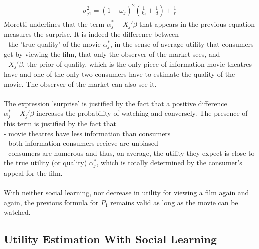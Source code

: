 	\begin{align*}
	\sigma_{j 1}^{2}=(1-\omega_{j})^{2}\left(\frac{1}{k_{j}}+\frac{1}{d}\right)+\frac{1}{r}
	\end{align*}
	Moretti underlines that the term $\alpha_{j}^{*}-X_{j}'\beta$ that appears in the previous equation measures the surprise. It is indeed the difference between\\
	- the 'true quality' of the movie $\alpha_{j}^{*}$, in the sense of average utility that consumers get by viewing the film, that only the observer of the market sees, and\\
	- $X_{j}'\beta$, the prior of quality, which is the only piece of information movie theatres have and one of the only two consumers have to estimate the quality of the movie. The observer of the market can also see it.\\
	\\
	The expression 'surprise' is justified by the fact that a positive difference $\alpha_{j}^{*}-X_{j}'\beta$ increases the probability of watching and conversely. The presence of this term is justified by the fact that\\
	- movie theatres have less information than consumers\\
	- both information consumers recieve are unbiased\\
	- consumers are numerous and thus, on average, the utility they expect is close to the true utility (or quality) $\alpha_{j}^{*}$, which is totally determined by the consumer's appeal for the film.\\
	\\
	With neither social learning, nor decrease in utility for viewing a film again and again, the previous formula for $P_{1}$ remains valid as long as the movie can be watched.\\
	
	\subsection{Utility Estimation With Social Learning}	
	
